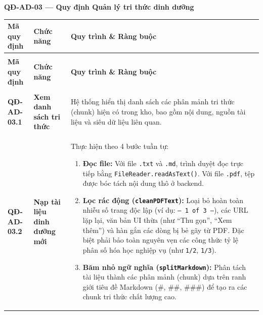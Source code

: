 \documentclass[12pt,a4paper]{article}
\begin{document}
\vspace{0.3cm}
\noindent\textbf{QĐ-AD-03 --- Quy định Quản lý tri thức dinh dưỡng}

\begin{longtable}{|
        >{\raggedright\arraybackslash}p{2.2cm}|
        >{\raggedright\arraybackslash}p{2.8cm}|
        >{\raggedright\arraybackslash}p{9.8cm}|}
    \hline
    \rowcolor{headerblue}
    \textbf{Mã quy định} & \textbf{Chức năng}                   & \textbf{Quy trình \& Ràng buộc}                                             \\
    \hline
    \endfirsthead
    \multicolumn{3}{c}{{\tablename\ -- Tiếp theo trang trước}}                                                                                \\
    \hline
    \rowcolor{headerblue}
    \textbf{Mã quy định} & \textbf{Chức năng}                   & \textbf{Quy trình \& Ràng buộc}                                             \\
    \hline
    \endhead
    \hline \multicolumn{3}{|r|}{{Tiếp tục ở trang sau...}}                                                                                    \\ \hline
    \endfoot
    \hline
    \endlastfoot
    \textbf{QĐ-AD-03.1}  & \textbf{Xem danh sách tri thức}      &
    Hệ thống hiển thị danh sách các phân mảnh tri thức (chunk) hiện có trong kho, bao gồm nội dung, nguồn tài liệu và siêu dữ liệu liên quan. \\
    \hline
    \textbf{QĐ-AD-03.2}  & \textbf{Nạp tài liệu dinh dưỡng mới} &
    Thực hiện theo 4 bước tuần tự:
    \begin{enumerate}[leftmargin=*,topsep=2pt,itemsep=1pt]
        \item \textbf{Đọc file:} Với file \texttt{.txt} và \texttt{.md}, trình duyệt đọc trực tiếp bằng \texttt{FileReader.readAsText()}. Với file \texttt{.pdf}, tệp được bóc tách nội dung thô ở backend.
        \item \textbf{Lọc rác động (\texttt{cleanPDFText}):} Loại bỏ hoàn toàn nhiễu số trang độc lập (ví dụ: \texttt{-- 1 of 3 --}), các URL lặp lại, văn bản UI thừa (như ``Thu gọn'', ``Xem thêm'') và hàn gắn các dòng bị bẻ gãy từ PDF. Đặc biệt phải bảo toàn nguyên vẹn các công thức tỷ lệ phân số hóa học nghiệp vụ (như \texttt{1/2}, \texttt{1/3}).
        \item \textbf{Băm nhỏ ngữ nghĩa (\texttt{splitMarkdown}):} Phân tách tài liệu thành các phân mảnh (chunk) dựa trên ranh giới tiêu đề Markdown (\#, \#\#, \#\#\#) để tạo ra các chunk tri thức chất lượng cao.

\end{enumerate}
\end{longtable}
\end{document}

